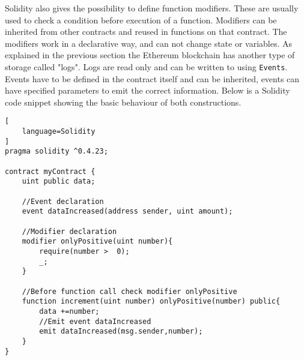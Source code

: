 \documentclass[a4paper]{article}
\begin{document}
Solidity also gives the possibility to define function modifiers. These are usually used to check a condition before execution of a function. Modifiers can be inherited from other contracts and reused in functions on that contract. The modifiers work in a declarative way, and can not change state or variables. As explained in the previous section the Ethereum blockchain has another type of storage called "logs".  Logs are read only and can be written to using \texttt{Events}. Events have to be defined in the contract itself and can be inherited, events can have specified parameters to emit the correct information. Below is a Solidity code snippet showing the basic behaviour of both constructions.
\begin{lstlisting}[
    language=Solidity
]
pragma solidity ^0.4.23;

contract myContract {
    uint public data; 
    
    //Event declaration
    event dataIncreased(address sender, uint amount);
    
    //Modifier declaration
    modifier onlyPositive(uint number){
        require(number >  0);
        _;
    }
    
    //Before function call check modifier onlyPositive
    function increment(uint number) onlyPositive(number) public{
        data +=number;
        //Emit event dataIncreased
        emit dataIncreased(msg.sender,number);
    }
} 
\end{lstlisting}
\end{document}
